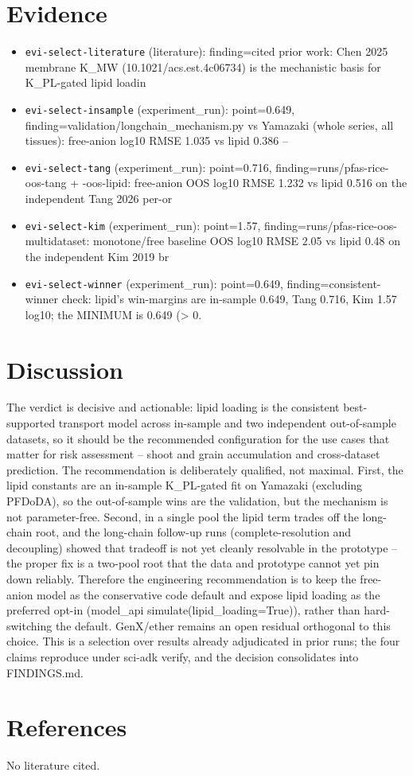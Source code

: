 \documentclass{article}
\begin{document}
\section{Evidence}
\begin{itemize}
  \item \texttt{evi-select-literature} (literature): finding=cited prior work: Chen 2025 membrane K\_MW (10.1021/acs.est.4c06734) is the mechanistic basis for K\_PL-gated lipid loadin
  \item \texttt{evi-select-insample} (experiment\_run): point=0.649, finding=validation/longchain\_mechanism.py vs Yamazaki (whole series, all tissues): free-anion log10 RMSE 1.035 vs lipid 0.386 --
  \item \texttt{evi-select-tang} (experiment\_run): point=0.716, finding=runs/pfas-rice-oos-tang + -oos-lipid: free-anion OOS log10 RMSE 1.232 vs lipid 0.516 on the independent Tang 2026 per-or
  \item \texttt{evi-select-kim} (experiment\_run): point=1.57, finding=runs/pfas-rice-oos-multidataset: monotone/free baseline OOS log10 RMSE 2.05 vs lipid 0.48 on the independent Kim 2019 br
  \item \texttt{evi-select-winner} (experiment\_run): point=0.649, finding=consistent-winner check: lipid's win-margins are in-sample 0.649, Tang 0.716, Kim 1.57 log10; the MINIMUM is 0.649 (> 0.
\end{itemize}

\section{Discussion}
The verdict is decisive and actionable: lipid loading is the consistent best-supported transport model across in-sample and two independent out-of-sample datasets, so it should be the recommended configuration for the use cases that matter for risk assessment -- shoot and grain accumulation and cross-dataset prediction. The recommendation is deliberately qualified, not maximal. First, the lipid constants are an in-sample K\_PL-gated fit on Yamazaki (excluding PFDoDA), so the out-of-sample wins are the validation, but the mechanism is not parameter-free. Second, in a single pool the lipid term trades off the long-chain root, and the long-chain follow-up runs (complete-resolution and decoupling) showed that tradeoff is not yet cleanly resolvable in the prototype -- the proper fix is a two-pool root that the data and prototype cannot yet pin down reliably. Therefore the engineering recommendation is to keep the free-anion model as the conservative code default and expose lipid loading as the preferred opt-in (model\_api simulate(lipid\_loading=True)), rather than hard-switching the default. GenX/ether remains an open residual orthogonal to this choice. This is a selection over results already adjudicated in prior runs; the four claims reproduce under sci-adk verify, and the decision consolidates into FINDINGS.md.

\section{References}
No literature cited.
\end{document}
